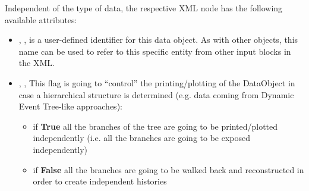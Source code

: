 Independent of the type of data, the respective XML node has the following
available attributes:
\vspace{-5mm}
\begin{itemize}
  \itemsep0em
  \item {}, , is a user-defined
  identifier for this data object.
  \nb As with other objects, this name can be used to refer to this specific
  entity from other input blocks in the XML.

  \item {}, , 
  This flag is going to ``control'' the printing/plotting of the DataObject in 
  case a hierarchical structure is determined (e.g.
  data coming from Dynamic Event Tree-like approaches):
  \begin{itemize}
    \item if \textbf{True} all the branches of the tree are going to be printed/plotted independently 
               (i.e. all the branches are going to be exposed independently)
    \item if \textbf{False} all the branches are going to be walked back and reconstructed in order to create independent histories
  \end{itemize}
\end{itemize}
